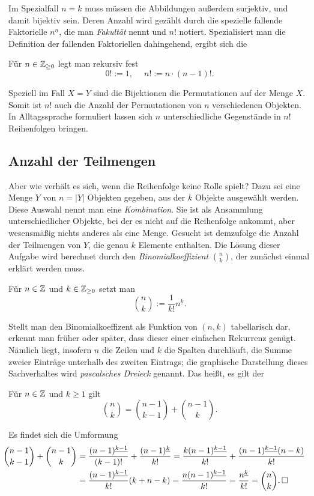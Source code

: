 \noindent
Im Spezialfall $n=k$ muss müssen die Abbildungen außerdem surjektiv, und
damit bijektiv sein. Deren Anzahl wird gezählt durch die spezielle
fallende Faktorielle $n^{\underline n}$, die man \emph{Fakultät} nennt
und $n!$ notiert. Spezialisiert man die Definition der fallenden
Faktoriellen dahingehend, ergibt sich die
\begin{Definition}[Fakultät]\newlinefirst
Für $n\in\mathbb Z_{\ge 0}$ legt man rekursiv fest
\[0! := 1,\quad\; n! := n\cdot (n-1)!.\]
\end{Definition}
Speziell im Fall $X=Y$ sind die Bijektionen die Permutationen auf der
Menge $X$. Somit ist $n!$ auch die Anzahl der Permutationen von $n$
verschiedenen Objekten. In Alltagssprache formuliert lassen sich
$n$ unterschiedliche Gegenstände in $n!$ Reihenfolgen bringen.

\subsection{Anzahl der Teilmengen}

Aber wie verhält es sich, wenn die Reihenfolge keine Rolle spielt?
Dazu sei eine Menge $Y$ von $n=|Y|$ Objekten gegeben, aus der $k$ Objekte
ausgewählt werden. Diese Auswahl nennt man eine \emph{Kombination}.
Sie ist als Ansammlung unterschiedlicher Objekte, bei der es nicht auf
die Reihenfolge ankommt, aber wesensmäßig nichts anderes als eine Menge.
Gesucht ist demzufolge die Anzahl der Teilmengen von $Y$, die genau
$k$ Elemente enthalten. Die Lösung dieser Aufgabe wird berechnet durch
den \emph{Binomialkoeffizient} $\binom{n}{k}$, der zunächst einmal
erklärt werden muss.
\begin{Definition}[Binomialkoeffizent]\newlinefirst
Für $n\in\mathbb Z$ und $k\in\mathbb Z_{\ge 0}$ setzt man
\[\binom{n}{k} := \frac{1}{k!}n^{\underline k}.\]
\end{Definition}

\noindent
Stellt man den Binomialkoeffizent als Funktion von $(n,k)$ tabellarisch
dar, erkennt man früher oder später, dass dieser einer einfachen
Rekurrenz genügt. Nämlich liegt, insofern $n$ die Zeilen und $k$ die Spalten
durchläuft, die Summe zweier Einträge unterhalb des
zweiten Eintrags; die graphische Darstellung dieses Sachverhaltes wird
\emph{pascalsches Dreieck} genannt. Das heißt, es gilt der
\begin{Satz}
Für $n\in\mathbb Z$ und $k\ge 1$ gilt
\[\binom{n}{k} = \binom{n-1}{k-1} + \binom{n-1}{k}.\]
\end{Satz}
\begin{Beweis}
Es findet sich die Umformung
\begin{align*}
\hspace{-12pt}\binom{n-1}{k-1} + \binom{n-1}{k}
&= \frac{(n-1)^{\underline{k-1}}}{(k-1)!} + \frac{(n-1)^{\underline k}}{k!}
= \frac{k(n-1)^{\underline{k-1}}}{k!} + \frac{(n-1)^{\underline{k-1}}(n-k)}{k!}\\
&= \frac{(n-1)^{\underline{k-1}}}{k!}(k + n -k)
= \frac{n(n-1)^{\underline{k-1}}}{k!}
= \frac{n^{\underline k}}{k!} = \binom{n}{k}.\,\qedsymbol
\end{align*}
\end{Beweis}

